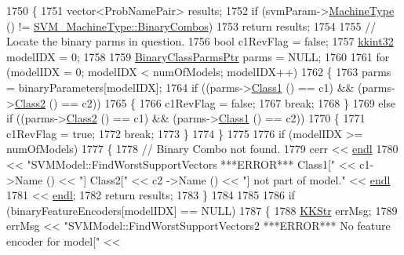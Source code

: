 \begin{DoxyCode}
1750 \{
1751   vector<ProbNamePair>  results;
1752   \textcolor{keywordflow}{if}  (svmParam->\hyperlink{class_k_k_m_l_l_1_1_s_v_mparam_a30153e00007f9cf65343e0ad97ad61fb}{MachineType} () != \hyperlink{namespace_k_k_m_l_l_ad917464bc631109a3021cf02cd27af9aa01ad67463554c5f5552dcc6b5f4a553f}{SVM\_MachineType::BinaryCombos})
1753     \textcolor{keywordflow}{return}  results;
1754 
1755   \textcolor{comment}{// Locate the binary parms in question.}
1756   \textcolor{keywordtype}{bool}  c1RevFlag = \textcolor{keyword}{false};
1757   \hyperlink{namespace_k_k_b_a8fa4952cc84fda1de4bec1fbdd8d5b1b}{kkint32}  modelIDX = 0;
1758 
1759   \hyperlink{class_k_k_m_l_l_1_1_binary_class_parms}{BinaryClassParmsPtr}  parms = NULL;
1760 
1761   \textcolor{keywordflow}{for}  (modelIDX = 0;  modelIDX < numOfModels;  modelIDX++)
1762   \{
1763     parms = binaryParameters[modelIDX];
1764     \textcolor{keywordflow}{if}  ((parms->\hyperlink{class_k_k_m_l_l_1_1_binary_class_parms_aa8519ac2f7f7e4553143e12786209415}{Class1} () == c1)  &&  (parms->\hyperlink{class_k_k_m_l_l_1_1_binary_class_parms_a38ea0c5dd0416d6aef402befeaf7a220}{Class2} () == c2))
1765     \{
1766       c1RevFlag = \textcolor{keyword}{false};
1767       \textcolor{keywordflow}{break};
1768     \}
1769     \textcolor{keywordflow}{else} \textcolor{keywordflow}{if}  ((parms->\hyperlink{class_k_k_m_l_l_1_1_binary_class_parms_a38ea0c5dd0416d6aef402befeaf7a220}{Class2} () == c1)  &&  (parms->\hyperlink{class_k_k_m_l_l_1_1_binary_class_parms_aa8519ac2f7f7e4553143e12786209415}{Class1} () == c2))
1770     \{
1771       c1RevFlag = \textcolor{keyword}{true};
1772       \textcolor{keywordflow}{break};
1773     \}
1774   \}
1775 
1776   \textcolor{keywordflow}{if}  (modelIDX >= numOfModels)
1777   \{
1778     \textcolor{comment}{// Binary Combo not found.}
1779     cerr << \hyperlink{namespace_k_k_b_ad1f50f65af6adc8fa9e6f62d007818a8}{endl}
1780          << \textcolor{stringliteral}{"SVMModel::FindWorstSupportVectors   ***ERROR***  Class1["} << c1->Name () << \textcolor{stringliteral}{"]  Class2["} << c2
      ->Name () << \textcolor{stringliteral}{"]  not part of model."} << \hyperlink{namespace_k_k_b_ad1f50f65af6adc8fa9e6f62d007818a8}{endl}
1781          << \hyperlink{namespace_k_k_b_ad1f50f65af6adc8fa9e6f62d007818a8}{endl};
1782     \textcolor{keywordflow}{return} results;
1783   \}
1784 
1785 
1786   \textcolor{keywordflow}{if}  (binaryFeatureEncoders[modelIDX] == NULL)
1787   \{
1788     \hyperlink{class_k_k_b_1_1_k_k_str}{KKStr}  errMsg;
1789     errMsg << \textcolor{stringliteral}{"SVMModel::FindWorstSupportVectors2   ***ERROR***   No feature encoder for model["} << 

\end{DoxyCode}
